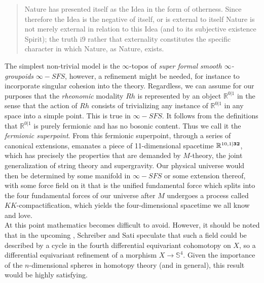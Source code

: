 \documentclass{article}
\begin{document}
\begin{quote}
    Nature has presented itself as the Idea in the form of otherness. Since therefore the Idea is the
negative of itself, or is external to itself Nature is not merely external in relation to this Idea (and
to its subjective existence Spirit); the truth i9 rather that externality constitutes the specific character
in which Nature, as Nature, exists.
\end{quote}

The simplest non-trivial model is the $\infty$-topos of \emph{super formal smooth $\infty$-groupoids}
$\infty-SFS$, however, a refinement might be needed, for instance to incorporate singular cohesion into
the theory. Regardless, we can assume for our purposes that the \emph{rheonomic} modality $Rh$ is represented
by an object $\mathbb{R}^{0|1}$ in the sense that the action of $Rh$ consists of trivializing any instance
of  $\mathbb{R}^{0|1}$ in any space into a simple point. This is true in $\infty-SFS$. It follows from
the definitions that $\mathbb{R}^{0|1}$ is purely fermionic and has no bosonic content. Thus we call it
the \emph{fermionic superpoint}. From this fermionic superpoint, through a series of canonical extensions,
emanates a piece of 11-dimensional spacetime $\mathbb{R}^{10,1|\textrm{\textbf{32}}}$, which has precisely
the properties that are demanded by $M$-theory, the joint generalization of string theory and supergravity.
Our physical universe would then be determined by some manifold in $\infty-SFS$ or some extension thereof,
with some force field on it that is the unified fundamental force which splits into the four fundamental
forces of our universe after $M$ undergoes a process called $KK$-compactification, which yields the four-dimensional
spacetime we all know and love. \\

At this point mathematics becomes difficult to avoid. However, it should be noted that in the upcoming
\cite{SSS}, Schreiber and Sati speculate that such a field could be described by a cycle in the fourth
differential equivariant cohomotopy on $X$, so a differential equivariant refinement of a morphism $X\rightarrow
\mathbb{S}^4$. Given the importance of the $n$-dimensional spheres in homotopy theory (and in general),
this result would be highly satisfying.
\end{document}
